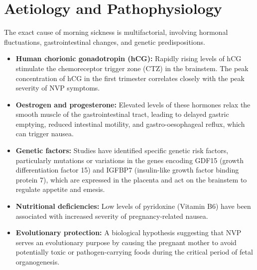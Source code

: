 \section*{Aetiology and Pathophysiology}
The exact cause of morning sickness is multifactorial, involving hormonal fluctuations, gastrointestinal changes, and genetic predispositions.
\begin{itemize}
    \item \textbf{Human chorionic gonadotropin (hCG):} Rapidly rising levels of hCG stimulate the chemoreceptor trigger zone (CTZ) in the brainstem. The peak concentration of hCG in the first trimester correlates closely with the peak severity of NVP symptoms.
    \item \textbf{Oestrogen and progesterone:} Elevated levels of these hormones relax the smooth muscle of the gastrointestinal tract, leading to delayed gastric emptying, reduced intestinal motility, and gastro-oesophageal reflux, which can trigger nausea.
    \item \textbf{Genetic factors:} Studies have identified specific genetic risk factors, particularly mutations or variations in the genes encoding GDF15 (growth differentiation factor 15) and IGFBP7 (insulin-like growth factor binding protein 7), which are expressed in the placenta and act on the brainstem to regulate appetite and emesis.
    \item \textbf{Nutritional deficiencies:} Low levels of pyridoxine (Vitamin B6) have been associated with increased severity of pregnancy-related nausea.
    \item \textbf{Evolutionary protection:} A biological hypothesis suggesting that NVP serves an evolutionary purpose by causing the pregnant mother to avoid potentially toxic or pathogen-carrying foods during the critical period of fetal organogenesis.
\end{itemize}

